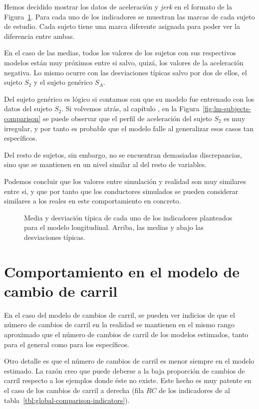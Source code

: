 Hemos decidido mostrar los datos de aceleración y \textit{jerk} en el formato de la Figura~\ref{fig:lc-global-comparison-indicators}. Para cada uno de los indicadores se muestran las marcas de cada sujeto de estudio. Cada sujeto tiene una marca diferente asignada para poder ver la diferencia entre ambas.

En el caso de las medias, todos los valores de los sujetos con sus respectivos modelos están muy próximos entre si salvo, quizá, los valores de la aceleración negativa. Lo mismo ocurre con las desviaciones típicas salvo por dos de ellos, el sujeto $S_2$ y el sujeto genérico $S_A$.

Del sujeto genérico es lógico si contamos con que su modelo fue entrenado con los datos del sujeto $S_2$. Si volvemos atrás, al capítulo , en la Figura~\ref{fig:lm-subjects-comparison} se puede observar que el perfil de aceleración del sujeto $S_2$ es muy irregular, y por tanto es probable que el modelo falle al generalizar esos casos tan específicos.

Del resto de sujetos, sin embargo, no se encuentran demasiadas discrepancias, sino que se mantienen en un nivel similar al del resto de variables.

Podemos concluir que los valores entre simulación y realidad son muy similares entre si, y que por tanto que los conductores simulados se pueden considerar similares a los reales en este comportamiento en concreto.

\begin{figure}[t]
	\centering
	\qquad
	\qquad
	\caption[Medias y desviaciones típicas de los indicadores del modelo longitudinal]{Media y desviación típica de cada uno de los indicadores planteados para el modelo longitudinal. Arriba, las medias y abajo las desviaciones típicas.}
	\label{fig:lc-global-comparison-indicators}
\end{figure}

\section{Comportamiento en el modelo de cambio de carril}

En el caso del modelo de cambios de carril, se pueden ver indicios de que el número de cambios de carril en la realidad se mantienen en el mismo rango aproximado que el número de cambios de carril de los modelos estimados, tanto para el general como para los específicos.

Otro detalle es que el número de cambios de carril es menor siempre en el modelo estimado. La razón creo que puede deberse a la baja proporción de cambios de carril respecto a los ejemplos donde éste no existe. Este hecho es muy patente en el caso de los cambios de carril a derecha (fila $RC$ de los indicadores de al tabla~\ref{tbl:global-comparison-indicators}).